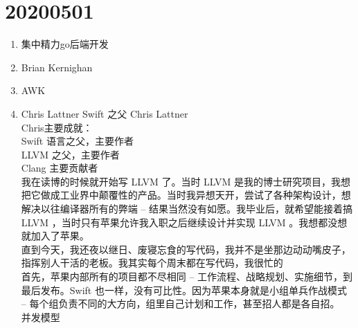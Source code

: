 \documentclass[12pt,oneside,a4paper]{ctexbook} %
\numberwithin{chapter}{part}
\begin{document}
% 
\section{20200501}
\begin{enumerate}
\item 
集中精力go后端开发
\item 
Brian Kernighan
\item 
AWK
\item 
Chris Lattner Swift 之父 Chris Lattner\\
Chris主要成就：\\
Swift 语言之父，主要作者\\
LLVM 之父，主要作者\\
Clang 主要贡献者\\
我在读博的时候就开始写 LLVM 了。当时 LLVM 是我的博士研究项目，我想把它做成工业界中颠覆性的产品。当时我异想天开，尝试了各种架构设计，想解决以往编译器所有的弊端 -- 结果当然没有如愿。我毕业后，就希望能接着搞 LLVM ，当时只有苹果允许我入职之后继续设计并实现 LLVM 。我想都没想就加入了苹果。\\
直到今天，我还夜以继日、废寝忘食的写代码，我并不是坐那边动动嘴皮子，指挥别人干活的老板。我其实每个周末都在写代码，我很忙的\\
首先，苹果内部所有的项目都不尽相同 -- 工作流程、战略规划、实施细节，到最后发布。Swift 也一样，没有可比性。因为苹果本身就是小组单兵作战模式 -- 每个组负责不同的大方向，组里自己计划和工作，甚至招人都是各自招。\\
并发模型\\

\end{enumerate}
\end{document}
